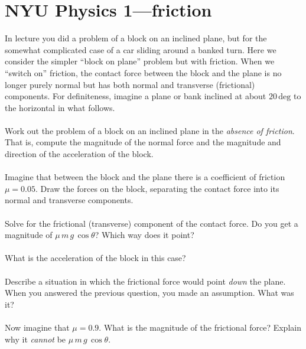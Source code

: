 \documentclass[12pt]{article}
\renewcommand{\deg}{\mathrm{deg}}
\newcounter{problem}
\begin{document}
\sloppy\sloppypar\raggedbottom\frenchspacing\thispagestyle{empty}

\section*{NYU Physics 1---friction}

In lecture you did a problem of a block on an inclined plane, but for
the somewhat complicated case of a car sliding around a banked turn.
Here we consider the simpler ``block on plane'' problem but with
friction.  When we ``switch on'' friction, the contact force between
the block and the plane is no longer purely normal but has both normal
and transverse (frictional) components.  For definiteness, imagine a
plane or bank inclined at about $20\,\deg$ to the horizontal in what
follows.

\paragraph{\theproblem}%
Work out the problem of a block on an inclined plane in the
\emph{absence of friction}.  That is, compute the magnitude of the
normal force and the magnitude and direction of the acceleration of
the block.

\paragraph{\theproblem}%
Imagine that between the block and the plane there is a coefficient of
friction $\mu=0.05$.  Draw the forces on the block, separating the
contact force into its normal and transverse components.

\paragraph{\theproblem}%
Solve for the frictional (transverse) component of the contact force.
Do you get a magnitude of $\mu\,m\,g\,\cos\theta$?  Which way does it
point?

\paragraph{\theproblem}%
What is the acceleration of the block in this case?

\paragraph{\theproblem}%
Describe a situation in which the frictional force would point
\emph{down} the plane.  When you answered the previous question, you
made an assumption.  What was it?

\paragraph{\theproblem}%
Now imagine that $\mu=0.9$.  What is the magnitude of the frictional
force?  Explain why it \emph{cannot} be $\mu\,m\,g\,\cos\theta$.
\end{document}
